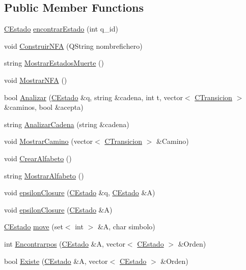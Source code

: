 \subsection*{Public Member Functions}
\begin{DoxyCompactItemize}
\item 
\hyperlink{classCEstado}{C\+Estado} \hyperlink{classCNFA_adefa2ccc519fcc5776f22b52ab7896a5}{encontrar\+Estado} (int q\+\_\+id)
\item 
void \hyperlink{classCNFA_ada66fe5bfcef0f2029d919fce2b7a101}{Construir\+N\+FA} (Q\+String nombrefichero)
\item 
string \hyperlink{classCNFA_a2229a8054ba76749dbeb90c20e4ed43b}{Mostrar\+Estados\+Muerte} ()
\item 
void \hyperlink{classCNFA_a856bedb1c7ed1b4e12bd9e3169de6831}{Mostrar\+N\+FA} ()
\item 
bool \hyperlink{classCNFA_a7ddf2ec61f8b50ca52835f9cef329df2}{Analizar} (\hyperlink{classCEstado}{C\+Estado} \&q, string \&cadena, int t, vector$<$ \hyperlink{classCTransicion}{C\+Transicion} $>$ \&caminos, bool \&acepta)
\item 
string \hyperlink{classCNFA_a9fee58c888ab16ea8e87bfbecd5252c8}{Analizar\+Cadena} (string \&cadena)
\item 
void \hyperlink{classCNFA_ae54534591a2ab8f762c95bcd2e8b3bdd}{Mostrar\+Camino} (vector$<$ \hyperlink{classCTransicion}{C\+Transicion} $>$ \&Camino)
\item 
void \hyperlink{classCNFA_ab5b7d6d69a73fea0eaa37f77b7c976d3}{Crear\+Alfabeto} ()
\item 
string \hyperlink{classCNFA_af87caa9992ea843c0252977bc150f382}{Mostrar\+Alfabeto} ()
\item 
void \hyperlink{classCNFA_ab44a10890c442fa25b505d4d4c1893f3}{epsilon\+Closure} (\hyperlink{classCEstado}{C\+Estado} \&q, \hyperlink{classCEstado}{C\+Estado} \&A)
\item 
void \hyperlink{classCNFA_ab267d2860617072d1ade5a6021baf07c}{epsilon\+Closure} (\hyperlink{classCEstado}{C\+Estado} \&A)
\item 
\hyperlink{classCEstado}{C\+Estado} \hyperlink{classCNFA_a4dc5f0d4dd40d4f160c1ad36d13dfb28}{move} (set$<$ int $>$ \&A, char simbolo)
\item 
int \hyperlink{classCNFA_a736e324e3fb34554aa260850d1f00980}{Encontrarpos} (\hyperlink{classCEstado}{C\+Estado} \&A, vector$<$ \hyperlink{classCEstado}{C\+Estado} $>$ \&Orden)
\item 
bool \hyperlink{classCNFA_a15d5ce134bcb51243b301a8817af83ab}{Existe} (\hyperlink{classCEstado}{C\+Estado} \&A, vector$<$ \hyperlink{classCEstado}{C\+Estado} $>$ \&Orden)

\end{DoxyCompactItemize}
